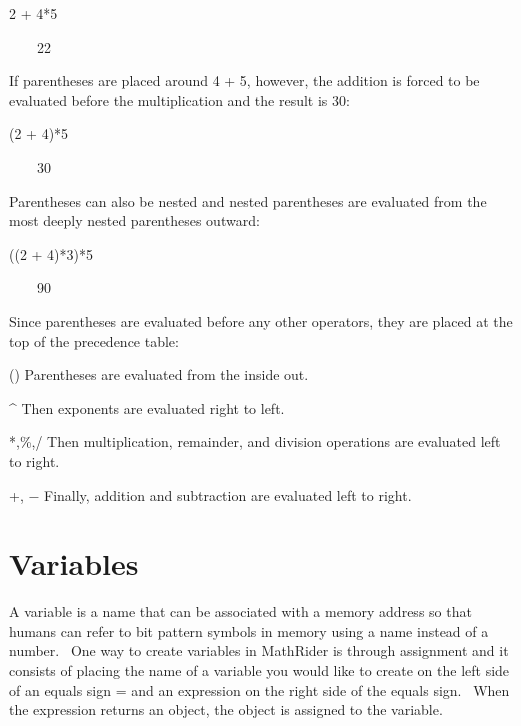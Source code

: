 \documentclass[12pt,twoside]{book}
\begin{document}
\bigskip

2 + 4*5

{\textbar}

\ \ \ \ 22


\bigskip

If parentheses are placed around 4 + 5, however, the addition is forced
to be evaluated before the multiplication and the result is 30:



(2 + 4)*5

{\textbar}

\ \ \ \ 30


\bigskip

Parentheses can also be nested and nested parentheses are evaluated from
the most deeply nested parentheses outward:


\bigskip

((2 + 4)*3)*5

{\textbar}

\ \ \ \ 90


\bigskip

Since parentheses are evaluated before any other operators, they are
placed at the top of the precedence table:


\bigskip

() Parentheses are evaluated from the inside out.


\bigskip

\^{} Then exponents are evaluated right to left.


\bigskip

*,\%,/ Then multiplication, remainder, and division operations are
evaluated left to right.


\bigskip

+, $-$ Finally, addition and subtraction are evaluated left to right.

\section[Variables]{Variables}
A variable is a name that can be associated with a memory address so
that humans can refer to bit pattern symbols in memory using a name
instead of a number. \ One way to create variables in MathRider is
through assignment and it consists of placing the name of a variable
you would like to create on the left side of an equals sign
{\textquotesingle}={\textquotesingle} and an expression on the right
side of the equals sign. \ When the expression returns an object, the
object is assigned to the variable. 
\end{document}
